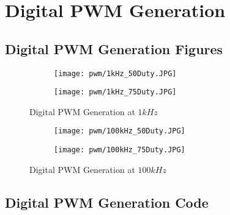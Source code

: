 \chapter{Digital PWM Generation} \label{A:digital_PWM}

\section{Digital PWM Generation Figures}

\begin{figure}[H]
    \centering
    \begin{subfigure}{0.45\textwidth}
        \texttt{[image: pwm/1kHz\_50Duty.JPG]}

    \end{subfigure}
    \begin{subfigure}{0.45\textwidth}
        \texttt{[image: pwm/1kHz\_75Duty.JPG]}

    \end{subfigure}
    \caption{Digital PWM Generation at $1kHz$}

\end{figure}

\begin{figure}[H]
    \centering
    \begin{subfigure}{0.45\textwidth}
        \texttt{[image: pwm/100kHz\_50Duty.JPG]}

    \end{subfigure}
    \begin{subfigure}{0.45\textwidth}
        \texttt{[image: pwm/100kHz\_75Duty.JPG]}

    \end{subfigure}
    \caption{Digital PWM Generation at $100kHz$}

\end{figure}

\newpage
\section{Digital PWM Generation Code}

